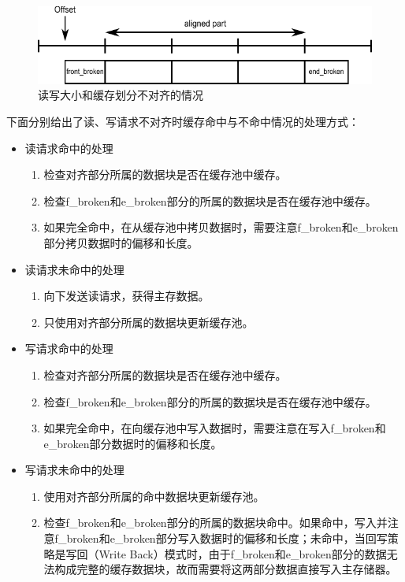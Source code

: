 \begin{figure}[H]
\centering
\includegraphics[width=0.75\linewidth]{./graph/vsize-cache-block}
\caption{读写大小和缓存划分不对齐的情况}
\label{fig:vsize-cache-block}
\end{figure}

下面分别给出了读、写请求不对齐时缓存命中与不命中情况的处理方式：

\begin{itemize}

\item 读请求命中的处理
\begin{enumerate}
\item 检查对齐部分所属的数据块是否在缓存池中缓存。
\item 检查f\_broken和e\_broken部分的所属的数据块是否在缓存池中缓存。
\item 如果完全命中，在从缓存池中拷贝数据时，需要注意f\_broken和e\_broken部分拷贝数据时的偏移和长度。
\end{enumerate}

\item 读请求未命中的处理
\begin{enumerate}
\item 向下发送读请求，获得主存数据。
\item 只使用对齐部分所属的数据块更新缓存池。
\end{enumerate}

\item 写请求命中的处理
\begin{enumerate}
\item 检查对齐部分所属的数据块是否在缓存池中缓存。
\item 检查f\_broken和e\_broken部分的所属的数据块是否在缓存池中缓存。
\item 如果完全命中，在向缓存池中写入数据时，需要注意在写入f\_broken和e\_broken部分数据时的偏移和长度。
\end{enumerate}

\item 写请求未命中的处理
\begin{enumerate}
\item 使用对齐部分所属的命中数据块更新缓存池。
\item 检查f\_broken和e\_broken部分的所属的数据块命中。如果命中，写入并注意f\_broken和e\_broken部分写入数据时的偏移和长度；未命中，当回写策略是写回（Write Back）模式时，由于f\_broken和e\_broken部分的数据无法构成完整的缓存数据块，故而需要将这两部分数据直接写入主存储器。
\end{enumerate}

\end{itemize}

